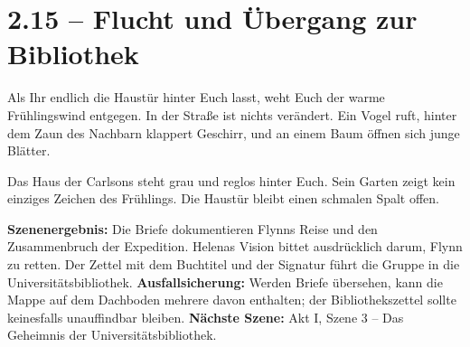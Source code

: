 \section{2.15 -- Flucht und Übergang zur Bibliothek}
\begin{vorlesetextalle}
Als Ihr endlich die Haustür hinter Euch lasst, weht Euch der warme Frühlingswind entgegen. In der Stra\ss{}e ist nichts verändert. Ein Vogel ruft, hinter dem Zaun des Nachbarn klappert Geschirr, und an einem Baum öffnen sich junge Blätter.

Das Haus der Carlsons steht grau und reglos hinter Euch. Sein Garten zeigt kein einziges Zeichen des Frühlings. Die Haustür bleibt einen schmalen Spalt offen.
\end{vorlesetextalle}
\begin{meisterinfo}
\textbf{Szenenergebnis:} Die Briefe dokumentieren Flynns Reise und den Zusammenbruch der Expedition. Helenas Vision bittet ausdrücklich darum, Flynn zu retten. Der Zettel mit dem Buchtitel und der Signatur führt die Gruppe in die Universitätsbibliothek. \textbf{Ausfallsicherung:} Werden Briefe übersehen, kann die Mappe auf dem Dachboden mehrere davon enthalten; der Bibliothekszettel sollte keinesfalls unauffindbar bleiben. \textbf{Nächste Szene:} Akt I, Szene 3 -- Das Geheimnis der Universitätsbibliothek.
\end{meisterinfo}
